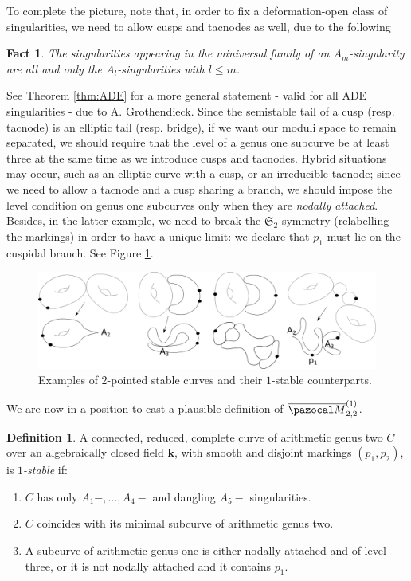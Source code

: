 \documentclass{compositio}
\renewcommand{\k}{\mathbf k}
\newcommand{\oM}{\overline{\pazocal M}}
\theoremstyle{plain}
\newtheorem*{fact}{Fact}
\theoremstyle{definition}
\newtheorem{definition}[thm]{Definition}
\theoremstyle{remark}
\begin{document}
To complete the picture, note that, in order to fix a deformation-open class of singularities, we need to allow cusps and tacnodes as well, due to the following
\begin{fact}
 The singularities appearing in the miniversal family of an $A_m$-singularity are all and only the $A_l$-singularities with $l\leq m$.
\end{fact}
See Theorem \ref{thm:ADE} for a more general statement - valid for all ADE singularities - due to A. Grothendieck. Since the semistable tail of a cusp (resp. tacnode) is an elliptic tail (resp. bridge), if we want our moduli space to remain separated, we should require that the level of a genus one subcurve be at least three at the same time as we introduce cusps and tacnodes. Hybrid situations may occur, such as an elliptic curve with a cusp, or an irreducible tacnode; since we need to allow a tacnode and a cusp sharing a branch, we should impose the level condition on genus one subcurves only when they are \emph{nodally attached}. Besides, in the latter example, we need to break the $\mathfrak S_2$-symmetry (relabelling the markings) in order to have a unique limit: we declare that $p_1$ must lie on the cuspidal branch. See Figure \ref{fig:one_tail_example}.

\begin{figure}[h]
 \includegraphics[width=\textwidth]{one_tail_example}
  \caption{Examples of $2$-pointed stable curves and their $1$-stable counterparts.}\label{fig:one_tail_example}
\end{figure}

We are now in a position to cast a plausible definition of $\oM_{2,2}^{(1)}$.
\begin{definition}
 A connected, reduced, complete curve of arithmetic genus two $C$ over an algebraically closed field $\k$, with smooth and disjoint markings $(p_1,p_2)$, is \emph{$1$-stable} if:
 \begin{enumerate}[leftmargin=0.7cm]
  \item $C$ has only $A_1-,\ldots,A_4-$ and dangling $A_5-$ singularities.
  \item $C$ coincides with its minimal subcurve of arithmetic genus two.
  \item A subcurve of arithmetic genus one is either nodally attached and of level three, or it is not nodally attached and it contains $p_1$.
 \end{enumerate}
\end{definition}
\end{document}

